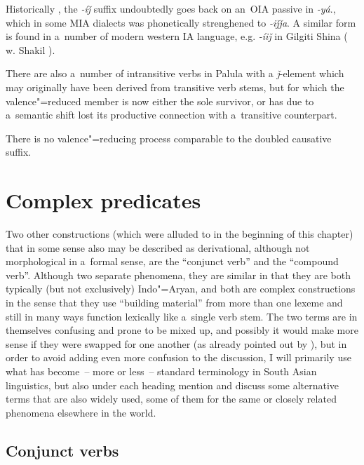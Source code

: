 Historically \citep[316--317]{masica1991}, the \textit{-íǰ} suffix undoubtedly goes back on an~OIA passive in \textit{-yá}., which in some MIA dialects was phonetically strenghened to \textit{-iǰǰa}. A similar form is found in a~number of modern western IA language, e.g. \textit{-íiǰ} in Gilgiti Shina (\citeauthor{radloffshakil1998} w. Shakil \citeyear[116]{radloffshakil1998}). 



There are also a~number of intransitive verbs in Palula with a \textit{ǰ}-element which may originally have been derived from transitive verb stems, but for which the valence"=reduced member is now either the sole survivor, or has due to a~semantic shift lost its productive connection with a~transitive counterpart.



There is no valence"=reducing process comparable to the doubled causative suffix.


\section{Complex predicates}
\label{sec:8-6}


Two other constructions (which were alluded to in the beginning of this chapter) that in some sense also may be described as derivational, although not morphological in a~formal sense, are the ``conjunct verb'' and the ``compound verb''. Although two separate phenomena, they are similar in that they are both typically (but not exclusively) Indo"=Aryan, and both are complex constructions in the sense that they use ``building material'' from more than one lexeme and still in many ways function lexically like a~single verb stem. The two terms are in themselves confusing and prone to be mixed up, and possibly it would make more sense if they were swapped for one another (as already pointed out by \citealt[326]{masica1991}), but in order to avoid adding even more confusion to the discussion, I will primarily use what has become~-- more or less~-- standard terminology in South Asian linguistics, but also under each heading mention and discuss some alternative terms that are also widely used, some of them for the same or closely related phenomena elsewhere in the world.


\subsection{Conjunct verbs}
\label{subsec:8-6-1}

